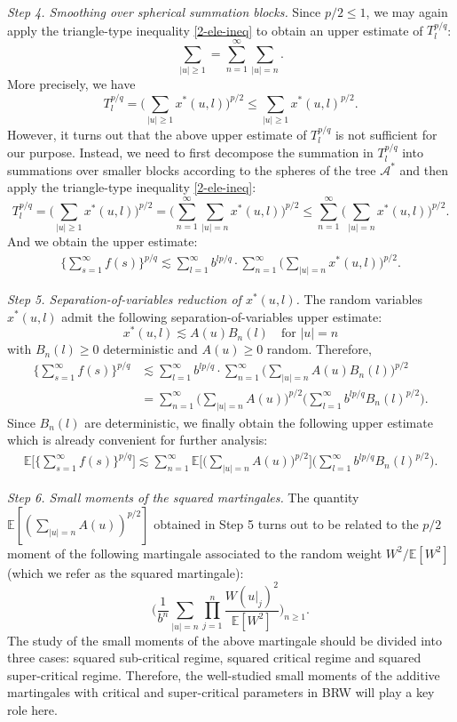 \documentclass[12pt]{amsart}
\theoremstyle{definition}
\theoremstyle{remark}
\newcommand{\E}{\mathbb{E}}
\newcommand{\Ab}{\mathcal{A}}
\numberwithin{equation}{section}
\begin{document}
{\flushleft \it Step 4. Smoothing over spherical summation blocks.}  Since $p/2\le 1$, we may again apply the triangle-type inequality \eqref{2-ele-ineq} to obtain an upper estimate of $T_l^{p/q}$: 
\[
\sum_{|u|\ge 1} = \sum_{n=1}^\infty\sum_{|u|=n}. 
\]
More precisely, we have 
\[
T_l^{p/q} = \Big(\sum_{|u|\ge 1} x^*(u, l) \Big)^{p/2}\le   \sum_{|u|\ge 1} x^*(u, l)^{p/2}. 
\]
However, it turns out that the above upper estimate of $T_l^{p/q}$  is not  sufficient for our purpose. Instead,   we need to first decompose the summation in $T_l^{p/q}$ into summations over smaller blocks according to the  spheres of the tree $\Ab^*$ and then apply the triangle-type inequality \eqref{2-ele-ineq}: 
\[
T_l^{p/q} =  \Big(\sum_{|u|\ge 1} x^*(u, l) \Big)^{p/2} =   \Big(\sum_{n=1}^\infty \sum_{|u| = n } x^*(u, l) \Big)^{p/2}  \le \sum_{n=1}^\infty  \Big ( \sum_{|u| = n } x^*(u, l) \Big)^{p/2}. 
\] 
And we obtain the upper estimate: 
\begin{align*}
\Big\{\sum_{s=1}^\infty f(s)\Big\}^{p/q} \lesssim  \sum_{l=1}^\infty b^{lp/q}  \cdot \sum_{n=1}^\infty  \Big ( \sum_{|u| = n } x^*(u, l) \Big)^{p/2}. 
\end{align*}

{\flushleft \it Step 5. Separation-of-variables reduction of $x^*(u, l)$. } 
The random variables $x^*(u, l)$ admit the following  separation-of-variables upper estimate:  
\[
x^*(u, l) \lesssim     A(u)B_n(l)  \quad \text{for $|u|=n$}
\]
with $B_n(l)\ge 0$  deterministic and $A(u)\ge 0$ random.  
Therefore, 
\begin{align*}
\Big\{\sum_{s=1}^\infty f(s)\Big\}^{p/q}  & \lesssim  \sum_{l=1}^\infty b^{lp/q}  \cdot \sum_{n=1}^\infty  \Big ( \sum_{|u| = n } A(u) B_n(l) \Big)^{p/2}
\\
& =   \sum_{n=1}^\infty  \Big ( \sum_{|u| = n } A(u) \Big)^{p/2}  \Big(\sum_{l=1}^\infty b^{lp/q}  B_n(l)^{p/2}\Big). 
\end{align*}
Since $B_n(l)$ are deterministic, we  finally obtain the following  upper estimate which is already convenient for further analysis: 
\begin{align*}
\E\Big[ \Big\{\sum_{s=1}^\infty f(s)\Big\}^{p/q} \Big]  \lesssim     \sum_{n=1}^\infty   \E\Big[  \Big ( \sum_{|u| = n } A(u) \Big)^{p/2}  \Big] \Big(\sum_{l=1}^\infty b^{lp/q}  B_n(l)^{p/2}\Big). 
\end{align*}

{\flushleft \it Step 6. Small moments of the squared martingales. } The quantity  $\E[   ( \sum_{|u| = n } A(u) )^{p/2} ]$  obtained in Step 5 turns out to be related to the $p/2$ moment of the following martingale  associated to the  random weight $W^2/\E[W^2]$ (which we refer as the squared martingale): 
\[
\Big( \frac{1}{b^n}\sum_{|u|=n}\prod_{j=1}^n \frac{W(u|_j)^2}{\E[W^2]}  \Big)_{n\ge 1}.
\]
The study of the small moments of the above martingale should be divided into three cases: squared sub-critical regime, squared critical regime and squared super-critical regime. Therefore,  the well-studied small moments of the additive martingales with  critical and super-critical parameters in BRW  will play a key role here. 
\end{document}
